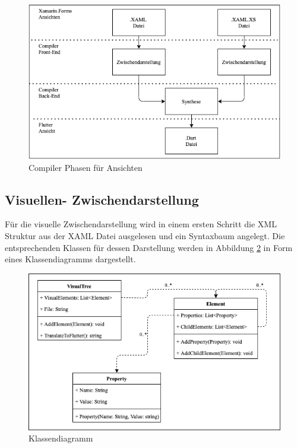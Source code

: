 \begin{figure}[!ht]
 \includegraphics[width=\textwidth,keepaspectratio]{Images/Implementation/ViewCompiler.png}
 \caption{Compiler Phasen für Ansichten}
 \label{fig:ViewCompilerPhases}
\end{figure}

\subsection{Visuellen- Zwischendarstellung}

Für die visuelle Zwischendarstellung wird in einem ersten Schritt die XML Struktur
aus der XAML Datei ausgelesen und ein Syntaxbaum angelegt.  Die entsprechenden Klassen für dessen Darstellung  werden in Abbildung \ref{fig:Klassendiagram} in Form eines Klassendiagramms dargestellt.
\newpage

\begin{figure}[!ht]
 \includegraphics[width=\textwidth,keepaspectratio]{Images/Implementation/Klassendiagram.png}
 \caption{Klassendiagramm}
 \label{fig:Klassendiagram}
\end{figure}


